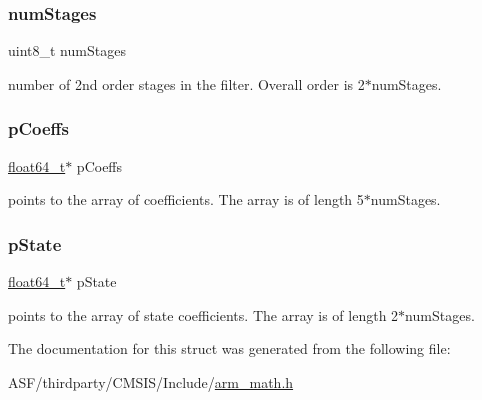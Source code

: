 \subsubsection{\texorpdfstring{numStages}{numStages}}
{\footnotesize\ttfamily uint8\+\_\+t num\+Stages}

number of 2nd order stages in the filter. Overall order is 2$\ast$num\+Stages. \mbox{\label{structarm__biquad__cascade__df2_t__instance__f64_a2f5f42f60a50d7cb39837fd9b80cd8f0}} 
\subsubsection{\texorpdfstring{pCoeffs}{pCoeffs}}
{\footnotesize\ttfamily \mbox{\hyperlink{arm__math_8h_ac55f3ae81b5bc9053760baacf57e47f4}{float64\+\_\+t}}$\ast$ p\+Coeffs}

points to the array of coefficients. The array is of length 5$\ast$num\+Stages. \mbox{\label{structarm__biquad__cascade__df2_t__instance__f64_ae97c926a7e3a4bfe26fcdd0a3cc2f5c6}} 
\subsubsection{\texorpdfstring{pState}{pState}}
{\footnotesize\ttfamily \mbox{\hyperlink{arm__math_8h_ac55f3ae81b5bc9053760baacf57e47f4}{float64\+\_\+t}}$\ast$ p\+State}

points to the array of state coefficients. The array is of length 2$\ast$num\+Stages. 

The documentation for this struct was generated from the following file\+:\begin{DoxyCompactItemize}
\item 
A\+S\+F/thirdparty/\+C\+M\+S\+I\+S/\+Include/\mbox{\hyperlink{arm__math_8h}{arm\+\_\+math.\+h}}\end{DoxyCompactItemize}
